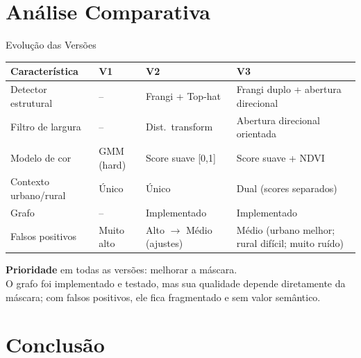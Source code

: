 \documentclass[aspectratio=169]{beamer}
\begin{document}
\section{Análise Comparativa}

\begin{frame}[t]{Evolução das Versões}
\centering
{\scriptsize
\renewcommand{\arraystretch}{1.18}
\setlength{\tabcolsep}{3pt}
\begin{tabularx}{\textwidth}{>{\raggedright\arraybackslash}p{2.35cm}YYY}
\toprule
\textbf{Característica} & \textbf{V1} & \textbf{V2} & \textbf{V3} \\
\midrule
Detector estrutural    & --              & Frangi + Top-hat        & Frangi duplo + abertura direcional \\
Filtro de largura      & --              & Dist.\ transform        & Abertura direcional orientada \\
Modelo de cor          & GMM (hard)      & Score suave [0,1]       & Score suave + NDVI \\
Contexto urbano/rural  & Único           & Único                   & Dual (scores separados) \\
Grafo                  & --              & Implementado            & Implementado \\
Falsos positivos       & Muito alto      & Alto $\rightarrow$ Médio (ajustes)    & Médio (urbano melhor; rural difícil; muito ruído) \\
\bottomrule
\end{tabularx}
}

\medskip
{\footnotesize \textbf{Prioridade} em todas as versões: melhorar a máscara.\\O grafo foi implementado e testado, mas sua qualidade depende diretamente da máscara; com falsos positivos, ele fica fragmentado e sem valor semântico.}
\end{frame}

\section{Conclusão}
\end{document}
